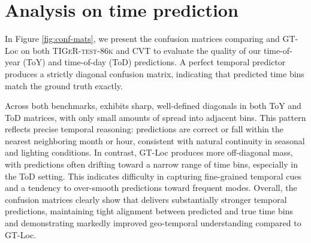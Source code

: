 \begin{table}[h!]
\centering
\caption{\textbf{Hemispheric balance in geo-time-aware image retrieval.} 
We report Recall@10 on the northern (N-R@10) and southern (S-R@10) hemispheres, along with their ratio (N/S), for \textsc{TIGeR-test-86k} and CVT. 
Values of N/S closer to 1 indicate more balanced performance across hemispheres. 
\tiger attains both the highest recalls and the most balanced N/S ratios on both datasets.}
\label{tab:geotime-hemispheres}
\end{table}



\section{Analysis on time prediction}
\label{sup:time-pred}

In Figure \ref{fig:conf-mats}, we present the confusion matrices comparing \tiger and GT-Loc on both \textsc{TIGeR-test-86k} and CVT to evaluate the quality of our time-of-year (ToY) and time-of-day (ToD) predictions. A perfect temporal predictor produces a strictly diagonal confusion matrix, indicating that predicted time bins match the ground truth exactly.

Across both benchmarks, \tiger exhibits sharp, well-defined diagonals in both ToY and ToD matrices, with only small amounts of spread into adjacent bins. This pattern reflects precise temporal reasoning: predictions are correct or fall within the nearest neighboring month or hour, consistent with natural continuity in seasonal and lighting conditions.
In contrast, GT-Loc produces more off-diagonal mass, with predictions often drifting toward a narrow range of time bins, especially in the ToD setting. This indicates difficulty in capturing fine-grained temporal cues and a tendency to over-smooth predictions toward frequent modes.
Overall, the confusion matrices clearly show that \tiger delivers substantially stronger temporal predictions, maintaining tight alignment between predicted and true time bins and demonstrating markedly improved geo-temporal understanding compared to GT-Loc.

